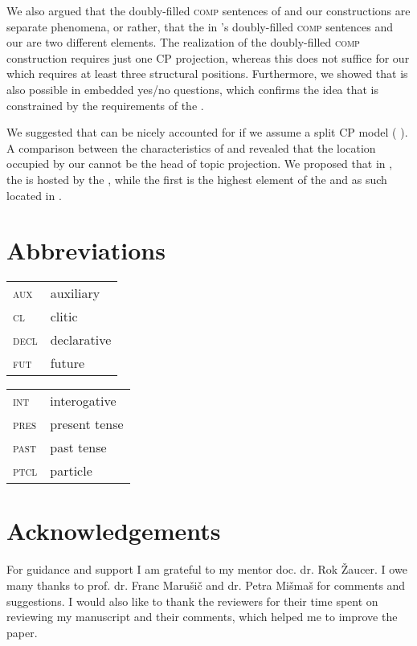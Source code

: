 \documentclass[output=paper,colorlinks,citecolor=brown]{langsci/langscibook}
\begin{document}
We also argued that the doubly-filled \textsc{comp} sentences of \cite{Bacskai2016} and our  constructions are separate phenomena, or ra\-ther, that the  in \citeauthor{Bacskai2016}'s doubly-filled \textsc{comp} sentences and our   are two different elements. The realization of the doubly-filled \textsc{comp} construction requires just one CP projection, whereas this does not suffice for our   which requires at least three structural positions. Furthermore, we showed that  is also possible in embedded yes/no questions, which confirms the idea that   is constrained by the requirements of the .

We suggested that    can be nicely accounted for if we assume a split CP model (\citeauthor{rizzi1997} \citeyear{rizzi1997, rizzi2001}). A comparison between the characteristics of  and   revealed that the location occupied by our   cannot be the head of topic projection. We proposed that in , the   is hosted by the , while the first  is the highest element of the  and as such located in .




\section*{Abbreviations}

\begin{tabularx}{.45\textwidth}{lX}
\textsc{aux}&auxiliary\\
\textsc{cl}&{clitic}\\
\textsc{decl}&declarative\\
\textsc{fut}&future\\
\end{tabularx}
\begin{tabularx}{.45\textwidth}{lX}
\textsc{int}&interogative\\
\textsc{pres}&present {tense}\\
\textsc{past}&past {tense}\\
\textsc{ptcl}&particle\\
\end{tabularx}

\section*{Acknowledgements}
For guidance and support I am grateful to my mentor doc. dr. Rok Žaucer. I owe many thanks to prof. dr. Franc Marušič and dr. Petra Mišmaš for comments and suggestions. I would also like to thank the reviewers for their time spent on reviewing my manuscript and their comments, which helped me to improve the paper.

\sloppy
\printbibliography[heading=subbibliography,notkeyword=this]
\end{document}
